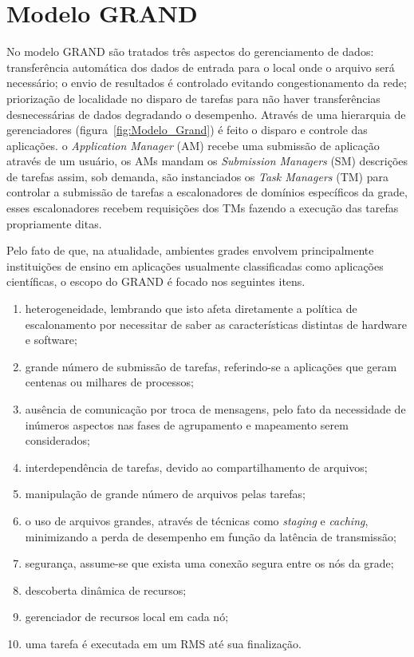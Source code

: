 \chapter{Modelo GRAND}
\label{cap:grand}

No modelo GRAND são tratados três aspectos do gerenciamento de dados: transferência automática dos dados de entrada para o local onde o arquivo será necessário; o envio de resultados é controlado evitando congestionamento da rede; priorização de localidade no disparo de tarefas para não haver transferências desnecessárias de dados degradando o desempenho. Através de uma hierarquia de gerenciadores (figura~\ref{fig:Modelo_Grand}) é feito o disparo e controle das aplicações. o \emph{Application Manager} (AM) recebe uma submissão de aplicação através de um usuário, os AMs mandam os \emph{Submission Managers} (SM) descrições de tarefas assim, sob demanda, são instanciados os \emph{Task Managers} (TM) para controlar a submissão de tarefas a escalonadores de domínios específicos da grade, esses escalonadores recebem requisições dos TMs fazendo a execução das tarefas propriamente ditas.

Pelo fato de que, na atualidade, ambientes grades envolvem principalmente instituições de ensino em aplicações usualmente classificadas como aplicações científicas, o escopo do GRAND é focado nos seguintes itens. 

\begin{enumerate}
    \item heterogeneidade, lembrando que isto afeta diretamente a política de escalonamento por necessitar de saber as características distintas de hardware e software; 
    \item grande número de submissão de tarefas, referindo-se a aplicações que geram centenas ou milhares de processos; 
    \item ausência de comunicação por troca de mensagens, pelo fato da necessidade de inúmeros aspectos nas fases de agrupamento e mapeamento serem considerados; 
    \item interdependência de tarefas, devido ao compartilhamento de arquivos; 
    \item manipulação de grande número de arquivos pelas tarefas; 
    \item o uso de arquivos grandes, através de técnicas como \emph{staging} e \emph{caching}, minimizando a perda de desempenho em função da latência de transmissão; 
    \item segurança, assume-se que exista uma conexão segura entre os nós da grade; 
    \item descoberta dinâmica de recursos; 
    \item gerenciador de recursos local em cada nó; 
    \item uma tarefa é executada em um RMS até sua finalização.
\end{enumerate}

